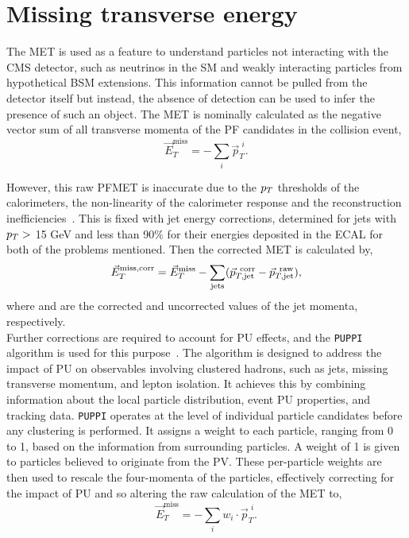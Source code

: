 \section{Missing transverse energy}

The \ac{MET} is used as a feature to understand particles not interacting with the \ac{CMS} detector, such as neutrinos in the \ac{SM} and weakly interacting particles from hypothetical \ac{BSM} extensions.
This information cannot be pulled from the detector itself but instead, the absence of detection can be used to infer the presence of such an object.
The \ac{MET} is nominally calculated as the negative vector sum of all transverse momenta of the \ac{PF} candidates in the collision event,
\begin{equation}
\vec{E}_{T}^{\text{miss}} = - \sum_{i} \vec{p}_{T}^{\hspace{4pt}i}.
\end{equation}

However, this raw \ac{PF}\ac{MET} is inaccurate due to the $p_{T}$ thresholds of the calorimeters, the non-linearity of the calorimeter response and the reconstruction inefficiencies~\cite{CMS:2016ljj}.
This is fixed with jet energy corrections, determined for jets with $p_{T}>$ 15 GeV and less than 90\% for their energies deposited in the \ac{ECAL} for both of the problems mentioned. 
Then the corrected \ac{MET} is calculated by,
\begin{equation}
\vec{E}_{T}^{\text{miss,corr}} = \vec{E}_{T}^{\text{miss}} - \sum_{\text{jets}} (\vec{p}_{T,\text{jet}}^{\text{\hspace{4pt}corr}} - \vec{p}_{T,\text{jet}}^{\text{\hspace{4pt}raw}}),
\end{equation}
where  and  are the corrected and uncorrected values of the jet momenta, respectively. \\

Further corrections are required to account for \ac{PU} effects, and the \texttt{PUPPI} algorithm is used for this purpose~\cite{CMS:2020ebo}.
The algorithm is designed to address the impact of \ac{PU} on observables involving clustered hadrons, such as jets, missing transverse momentum, and lepton isolation. 
It achieves this by combining information about the local particle distribution, event \ac{PU} properties, and tracking data. 
\texttt{PUPPI} operates at the level of individual particle candidates before any clustering is performed. 
It assigns a weight to each particle, ranging from 0 to 1, based on the information from surrounding particles. 
A weight of 1 is given to particles believed to originate from the \ac{PV}. 
These per-particle weights are then used to rescale the four-momenta of the particles, effectively correcting for the impact of \ac{PU} and so altering the raw calculation of the \ac{MET} to,
\begin{equation}
\vec{E}_{T}^{\text{miss}} = - \sum_{i} w_{i} \cdot \vec{p}_{T}^{\hspace{4pt}i}.
\end{equation}

